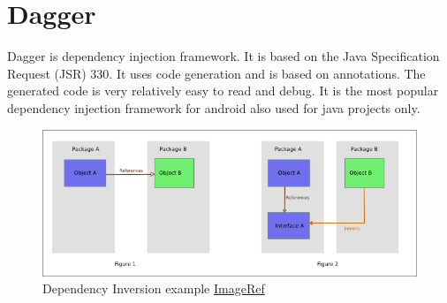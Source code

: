 \newpage
    \section{Dagger}
        \label{appendix:dagger}
        Dagger is dependency injection framework. It is based on the 
        Java Specification Request (JSR) 330. 
        It uses code generation and is based 
        on annotations. The generated code is very relatively easy to read 
        and debug. It is the most popular dependency injection framework
        for android also used for java projects only.

        
    \begin{figure}[htbp!]
        \centering \includegraphics[scale=0.85]{grafiken/di.jpg}
        \caption{Dependency Inversion example
        \href{https://upload.wikimedia.org/wikipedia/commons/9/96/Dependency_inversion.png}{ImageRef}}
        \label{fig:DIExample}
    \end{figure}